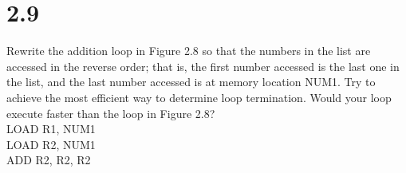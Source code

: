 \documentclass{article}
\begin{document}
\section{2.9}
Rewrite the addition loop in Figure 2.8 so that the numbers in the list are accessed in the reverse order; that is, the first number accessed is the last one in the list, and the last number accessed is at memory location NUM1. Try to achieve the most efficient way to determine loop termination. Would your loop execute faster than the loop in Figure 2.8?
\vspace{0.5cm}
\\ LOAD R1, NUM1
\\ LOAD R2, NUM1
\\ ADD R2, R2, R2
\end{document}
